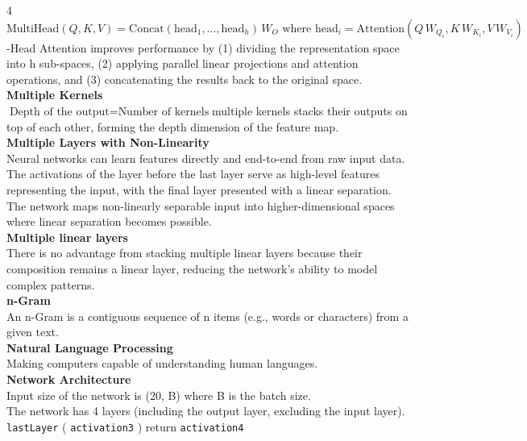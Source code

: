 \documentclass[8pt]{extarticle}
\begin{document}
\begin{multicols}{4}
{$ \text{MultiHead}(Q, K, V) = \text{Concat}(\text{head}_1, \dots, \text{head}_h) \, W_O \text{ where } \text{head}_i = \text{Attention}(Q \, W_{Q_i}, K \, W_{K_i}, V \, W_{V_i}) $\Multi-Head Attention improves performance by (1) dividing the representation space into h sub-spaces, (2) applying parallel linear projections and attention operations, and (3) concatenating the results back to the original space.\\
\vspace{2pt}\textbf{Multiple Kernels}\\
$ \text{Depth of the output} = \text{Number of kernels} $\Applying multiple kernels stacks their outputs on top of each other, forming the depth dimension of the feature map.\\
\vspace{2pt}\textbf{Multiple Layers with Non-Linearity}\\
Neural networks can learn features directly and end-to-end from raw input data. The activations of the layer before the last layer serve as high-level features representing the input, with the final layer presented with a linear separation. The network maps non-linearly separable input into higher-dimensional spaces where linear separation becomes possible.\\
\vspace{2pt}\textbf{Multiple linear layers}\\
There is no advantage from stacking multiple linear layers because their composition remains a linear layer, reducing the network's ability to model complex patterns.\\
\vspace{2pt}\textbf{n-Gram}\\
An n-Gram is a contiguous sequence of n items (e.g., words or characters) from a given text.\\
\vspace{2pt}\textbf{Natural Language Processing}\\
Making computers capable of understanding human languages.\\
\vspace{2pt}\textbf{Network Architecture}\\
Input size of the network is (20, B) where B is the batch size.\\
The network has 4 layers (including the output layer, excluding the input layer).\\
\texttt{lastLayer} ( \texttt{activation3} ) return \texttt{activation4}\\
}
\end{multicols}
\end{document}
